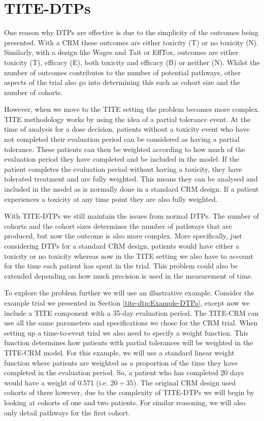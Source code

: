 \section{TITE-DTPs}
\label{tite-dtp:TITE-DTPs}

One reason why DTPs are effective is due to the simplicity of the outcomes being presented. With a CRM these outcomes are either toxicity (T) or no toxicity (N). Similarly, with a design like Wages and Tait or EffTox, outcomes are either toxicity (T), efficacy (E), both toxicity and efficacy (B) or neither (N). Whilst the number of outcomes contributes to the number of potential pathways, other aspects of the trial also go into determining this such as cohort size and the number of cohorts. 

However, when we move to the TITE setting the problem becomes more complex. TITE methodology works by using the idea of a partial tolerance event. At the time of analysis for a dose decision, patients without a toxicity event who have not completed their evaluation period can be considered as having a partial tolerance. These patients can then be weighted according to how much of the evaluation period they have completed and be included in the model. If the patient completes the evaluation period without having a toxicity, they have tolerated treatment and are fully weighted. This means they can be analysed and included in the model as is normally done in a standard CRM design. If a patient experiences a toxicity at any time point they are also fully weighted. 

With TITE-DTPs we still maintain the issues from normal DTPs. The number of cohorts and the cohort sizes determines the number of pathways that are produced, but now the outcome is also more complex. More specifically, just considering DTPs for a standard CRM design, patients would have either a toxicity or no toxicity whereas now in the TITE setting we also have to account for the time each patient has spent in the trial. This problem could also be extended depending on how much precision is used in the measurement of time. 

To explore the problem further we will use an illustrative example. Consider the example trial we presented in Section \ref{tite-dtp:Example-DTPs}, except now we include a TITE component with a 35-day evaluation period. The TITE-CRM can use all the same parameters and specifications we chose for the CRM trial. When setting up a time-to-event trial we also need to specify a weight function. This function determines how patients with partial tolerances will be weighted in the TITE-CRM model. For this example, we will use a standard linear weight function where patients are weighted as a proportion of the time they have completed in the evaluation period. So, a patient who has completed 20 days would have a weight of 0.571 (i.e. $20 \div 35$). The original CRM design used cohorts of three however, due to the complexity of TITE-DTPs we will begin by looking at cohorts of one and two patients. For similar reasoning, we will also only detail pathways for the first cohort. 

